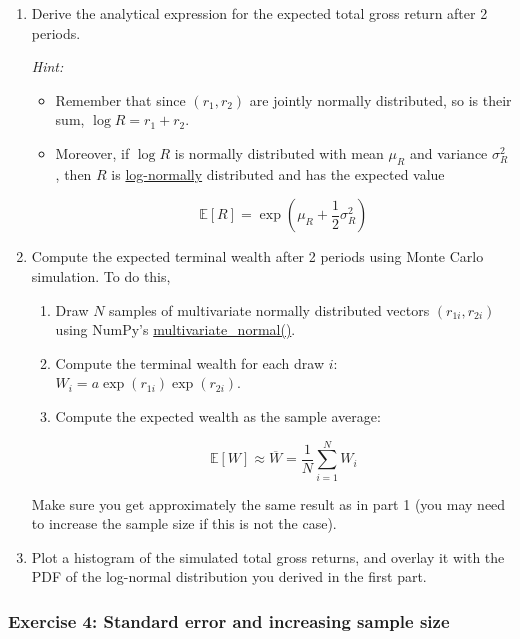 \documentclass{scrartcl}
\begin{document}
\begin{enumerate}
\def\labelenumi{\arabic{enumi}.}
\item
  Derive the analytical expression for the expected total gross return
  after 2 periods.

  \emph{Hint:}

  \begin{itemize}
  \item
    Remember that since \((r_1,r_2)\) are jointly normally distributed,
    so is their sum, \(\log R = r_1 + r_2\).
  \item
    Moreover, if \(\log R\) is normally distributed with mean \(\mu_R\)
    and variance \(\sigma_R^2\), then \(R\) is
    \href{https://en.wikipedia.org/wiki/Log-normal_distribution}{log-normally}
    distributed and has the expected value

    \[\mathbb{E}[R] = \exp\left(\mu_R + \frac{1}{2}\sigma_R^2 \right)\]
  \end{itemize}
\item
  Compute the expected terminal wealth after 2 periods using Monte Carlo
  simulation. To do this,

  \begin{enumerate}
  \def\labelenumii{\arabic{enumii}.}
  \item
    Draw \(N\) samples of multivariate normally distributed vectors
    \((r_{1i},r_{2i})\) using NumPy's
    \href{https://numpy.org/doc/stable/reference/random/generated/numpy.random.multivariate_normal.html}{multivariate\_normal()}.
  \item
    Compute the terminal wealth for each draw \(i\):
    \(W_i = a\exp(r_{1i})\exp(r_{2i})\).
  \item
    Compute the expected wealth as the sample average:

    \[\mathbb{E}[W] \approx \overline{W} = \frac{1}{N}\sum_{i=1}^N W_i\]
  \end{enumerate}

  Make sure you get approximately the same result as in part 1 (you may
  need to increase the sample size if this is not the case).
\item
  Plot a histogram of the simulated total gross returns, and overlay it
  with the PDF of the log-normal distribution you derived in the first
  part.
\end{enumerate}

    \hypertarget{exercise-4-standard-error-and-increasing-sample-size}{%
\subsubsection{Exercise 4: Standard error and increasing sample
size}\label{exercise-4-standard-error-and-increasing-sample-size}}
\end{document}
